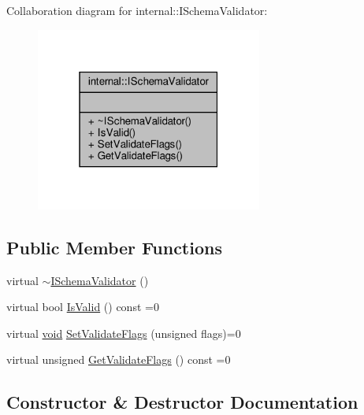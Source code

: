 Collaboration diagram for internal\+:\+:I\+Schema\+Validator\+:
\nopagebreak
\begin{figure}[H]
\begin{center}
\leavevmode
\includegraphics[width=211pt]{classinternal_1_1ISchemaValidator__coll__graph}
\end{center}
\end{figure}
\subsection*{Public Member Functions}
\begin{DoxyCompactItemize}
\item 
virtual \hyperlink{classinternal_1_1ISchemaValidator_aac77356c7a3f439bc5fb5302f3060c1d}{$\sim$\+I\+Schema\+Validator} ()
\item 
virtual bool \hyperlink{classinternal_1_1ISchemaValidator_a94f61f24b1447497279ef12ee0127285}{Is\+Valid} () const =0
\item 
virtual \hyperlink{imgui__impl__opengl3__loader_8h_ac668e7cffd9e2e9cfee428b9b2f34fa7}{void} \hyperlink{classinternal_1_1ISchemaValidator_a29b7df0935c87630bbb70c1e19d4c722}{Set\+Validate\+Flags} (unsigned flags)=0
\item 
virtual unsigned \hyperlink{classinternal_1_1ISchemaValidator_aa27d587f8e6fa2b95235a6ffa077429d}{Get\+Validate\+Flags} () const =0
\end{DoxyCompactItemize}


\subsection{Constructor \& Destructor Documentation}
\mbox{\label{classinternal_1_1ISchemaValidator_aac77356c7a3f439bc5fb5302f3060c1d}} 
